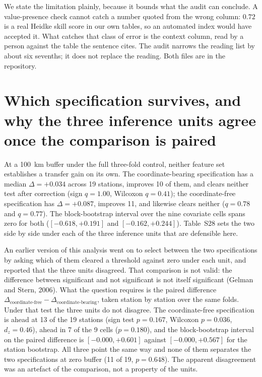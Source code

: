 \documentclass[11pt]{article}
\begin{document}
We state the limitation plainly, because it bounds what the audit can conclude. A value-presence
check cannot catch a number quoted from the wrong column: $0.72$ is a real Heidke skill
score in our own tables, so an automated index would have accepted it. What catches that
class of error is the context column, read by a person against the table the sentence
cites. The audit narrows the reading list by about six sevenths; it does not replace the
reading. Both files are in the repository.


\section{Which specification survives, and why the three inference units agree once the comparison is paired}
At a 100~km buffer under the full three-fold control, neither feature set establishes a
transfer gain on its own. The coordinate-bearing specification has a median
$\Delta=+0.034$ across 19 stations, improves 10 of them, and clears neither test after
correction (sign $q=1.00$, Wilcoxon $q=0.41$); the coordinate-free specification has
$\Delta=+0.087$, improves 11, and likewise clears neither ($q=0.78$ and $q=0.77$). The
block-bootstrap interval over the nine covariate cells spans zero for both
($[-0.618,+0.191]$ and $[-0.162,+0.244]$). Table~S28 sets the two side by side under each
of the three inference units that are defensible here.

An earlier version of this analysis went on to select between the two specifications by
asking which of them cleared a threshold against zero under each unit, and reported that
the three units disagreed. That comparison is not valid: the difference between
significant and not significant is not itself significant (Gelman and Stern, 2006). What the
question requires is the paired difference
$\Delta_{\text{coordinate-free}}-\Delta_{\text{coordinate-bearing}}$, taken station by
station over the same folds. Under that test the three units do not disagree. The
coordinate-free specification is ahead at 13 of the 19 stations (sign test $p=0.167$,
Wilcoxon $p=0.036$, $d_z=0.46$), ahead in 7 of the 9 cells ($p=0.180$), and the
block-bootstrap interval on the paired difference is $[-0.000,+0.601]$ against
$[-0.000,+0.567]$ for the station bootstrap. All three point the same way and none of them
separates the two specifications at zero buffer (11 of 19, $p=0.648$). The apparent
disagreement was an artefact of the comparison, not a property of the units.
\end{document}
